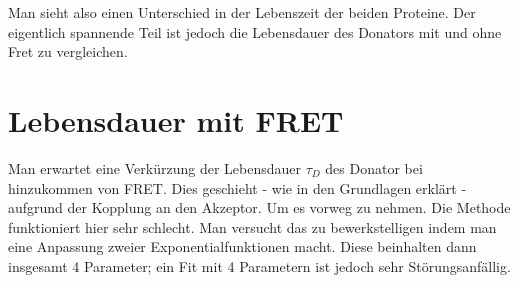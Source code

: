 Man sieht also einen Unterschied in der Lebenszeit der beiden Proteine. Der eigentlich spannende Teil 
ist jedoch die Lebensdauer des Donators mit und ohne Fret zu vergleichen.

\section{Lebensdauer mit FRET}

Man erwartet eine Verkürzung der Lebensdauer $\tau_D$ des Donator bei hinzukommen von FRET. Dies geschieht 
- wie in den Grundlagen erklärt - aufgrund der Kopplung an den Akzeptor. Um es vorweg zu nehmen. Die Methode funktioniert hier sehr schlecht. 
Man versucht das zu bewerkstelligen indem man eine Anpassung zweier Exponentialfunktionen macht. Diese beinhalten dann insgesamt 4 Parameter; 
ein Fit mit 4 Parametern ist jedoch sehr Störungsanfällig.